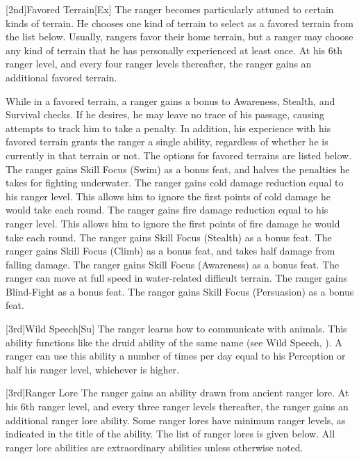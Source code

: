 [2nd]{Favored Terrain}[Ex]
The ranger becomes particularly attuned to certain kinds of terrain.
He chooses one kind of terrain to select as a favored terrain from the list below.
Usually, rangers favor their home terrain, but a ranger may choose any kind of terrain that he has personally experienced at least once.
At his 6th ranger level, and every four ranger levels thereafter, the ranger gains an additional favored terrain.
\par While in a favored terrain, a ranger gains a  bonus to Awareness, Stealth, and Survival checks.
If he desires, he may leave no trace of his passage, causing attempts to track him to take a  penalty.
In addition, his experience with his favored terrain grants the ranger a single ability, regardless of whether he is currently in that terrain or not.
The options for favored terrains are listed below.
The ranger gains Skill Focus (Swim) as a bonus feat, and halves the penalties he takes for fighting underwater.
The ranger gains cold damage reduction equal to his ranger level.
This allows him to ignore the first points of cold damage he would take each round.
The ranger gains fire damage reduction equal to his ranger level.
This allows him to ignore the first points of fire damage he would take each round.
The ranger gains Skill Focus (Stealth) as a bonus feat.
The ranger gains Skill Focus (Climb) as a bonus feat, and takes half damage from falling damage.
The ranger gains Skill Focus (Awareness) as a bonus feat.
The ranger can move at full speed in water-related difficult terrain.
The ranger gains Blind-Fight as a bonus feat.
The ranger gains Skill Focus (Persuasion) as a bonus feat.

[3rd]{Wild Speech}[Su]
The ranger learns how to communicate with animals.
This ability functions like the druid ability of the same name (see Wild Speech, ).
A ranger can use this ability a number of times per day equal to his Perception or half his ranger level, whichever is higher.

[3rd]{Ranger Lore}
The ranger gains an ability drawn from ancient ranger lore.
At his 6th ranger level, and every three ranger levels thereafter, the ranger gains an additional ranger lore ability.
Some ranger lores have minimum ranger levels, as indicated in the title of the ability.
The list of ranger lores is given below.
All ranger lore abilities are extraordinary abilities unless otherwise noted.

